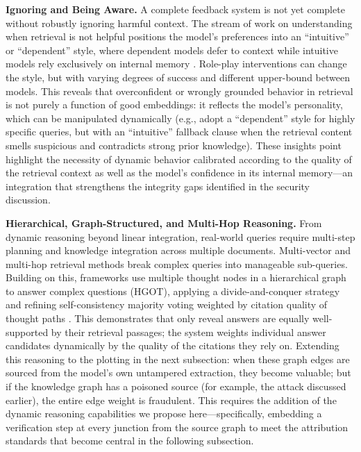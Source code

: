 \documentclass[11pt]{article}
\begin{document}
\textbf{Ignoring and Being Aware.} A complete feedback system is not yet complete without robustly ignoring harmful context. The stream of work on understanding when retrieval is not helpful positions the model's preferences into an ``intuitive'' or ``dependent'' style, where dependent models defer to context while intuitive models rely exclusively on internal memory \cite{ref248}. Role-play interventions can change the style, but with varying degrees of success and different upper-bound between models. This reveals that overconfident or wrongly grounded behavior in retrieval is not purely a function of good embeddings: it reflects the model's personality, which can be manipulated dynamically (e.g., adopt a ``dependent'' style for highly specific queries, but with an ``intuitive'' fallback clause when the retrieval content smells suspicious and contradicts strong prior knowledge). These insights point highlight the necessity of dynamic behavior calibrated according to the quality of the retrieval context as well as the model's confidence in its internal memory---an integration that strengthens the integrity gaps identified in the security discussion.

\textbf{Hierarchical, Graph-Structured, and Multi-Hop Reasoning.} From dynamic reasoning beyond linear integration, real-world queries require multi-step planning and knowledge integration across multiple documents. Multi-vector and multi-hop retrieval methods break complex queries into manageable sub-queries. Building on this, frameworks use multiple thought nodes in a hierarchical graph to answer complex questions (HGOT), applying a divide-and-conquer strategy and refining self-consistency majority voting weighted by citation quality of thought paths \cite{ref48}. This demonstrates that only reveal answers are equally well-supported by their retrieval passages; the system weights individual answer candidates dynamically by the quality of the citations they rely on. Extending this reasoning to the plotting in the next subsection: when these graph edges are sourced from the model's own untampered extraction, they become valuable; but if the knowledge graph has a poisoned source (for example, the attack discussed earlier), the entire edge weight is fraudulent. This requires the addition of the dynamic reasoning capabilities we propose here---specifically, embedding a verification step at every junction from the source graph to meet the attribution standards that become central in the following subsection.
\end{document}
